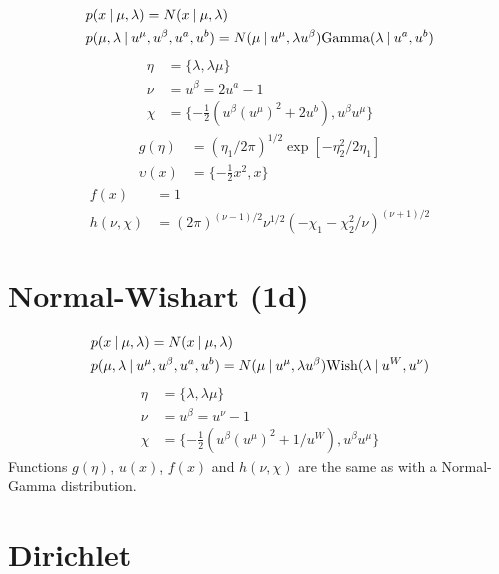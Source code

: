 \begin{align}
  &
  p(x \:|\: \mu,\lambda) 
  =
  N(x \:|\: \mu, \lambda)\\
  &
  p(\mu, \lambda \:|\: u^\mu, u^\beta, u^a, u^b)
  =
  N(\mu \:|\: u^\mu, \lambda u^\beta) \mathrm{Gamma}(\lambda \:|\: u^a, u^b) 
\end{align}
\begin{align}
  \eta &= \{ \lambda, \lambda \mu \} \\
  \nu &= u^\beta = 2 u^a - 1 \\
  \chi &= \{ -\tfrac{1}{2}(u^\beta (u^\mu)^2 + 2 u^b), u^\beta u^\mu \}
\end{align}
\begin{align}
  g(\eta) &= (\eta_1 / 2\pi)^{1/2} \exp [-\eta_2^2 / 2 \eta_1] \\
  \upsilon(x) &= \{-\tfrac{1}{2} x^2, x \}
\end{align}
\begin{align}
  f(x) &= 1 \\
  h(\nu, \chi) &= (2 \pi)^{(\nu-1)/2}  \nu^{1/2}  (-\chi_1 - \chi_2^2/\nu)^{(\nu+1)/2}
\end{align}

\section{Normal-Wishart (1d)} \label{ssec:conj-exp-norm-wish}

\begin{align}
  &
  p(x \:|\: \mu,\lambda) 
  =
  N(x \:|\: \mu, \lambda)\\
  &
  p(\mu, \lambda \:|\: u^\mu, u^\beta, u^a, u^b)
  =
  N(\mu \:|\: u^\mu, \lambda u^\beta) \mathrm{Wish}(\lambda \:|\: u^W, u^\nu) 
\end{align}
\begin{align}
  \eta &= \{ \lambda, \lambda \mu \} \\
  \nu &= u^\beta = u^\nu - 1 \\
  \chi &= \{ -\tfrac{1}{2}(u^\beta (u^\mu)^2 + 1/u^W), u^\beta u^\mu \}
\end{align}
Functions $g(\eta)$, $u(x)$, $f(x)$ and $h(\nu, \chi)$ are the same as with a Normal-Gamma distribution.

\section{Dirichlet} \label{ssec:conj-exp-dir}

